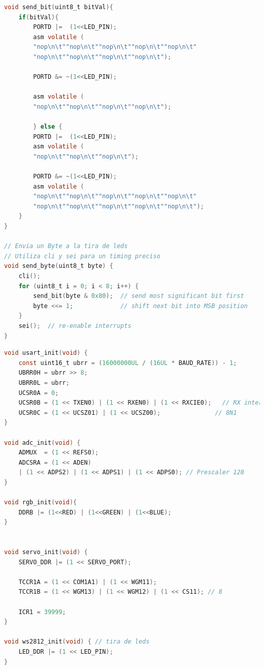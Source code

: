 \begin{lstlisting}[language=C, caption={Enviado de datos a tira LED`'}]
void send_bit(uint8_t bitVal){
	if(bitVal){
		PORTD |=  (1<<LED_PIN);
		asm volatile (
		"nop\n\t""nop\n\t""nop\n\t""nop\n\t""nop\n\t"
		"nop\n\t""nop\n\t""nop\n\t""nop\n\t");
		
		PORTD &= ~(1<<LED_PIN);
		
		asm volatile (
		"nop\n\t""nop\n\t""nop\n\t""nop\n\t");
		
		} else {
		PORTD |=  (1<<LED_PIN);
		asm volatile (
		"nop\n\t""nop\n\t""nop\n\t");
		
		PORTD &= ~(1<<LED_PIN);
		asm volatile (
		"nop\n\t""nop\n\t""nop\n\t""nop\n\t""nop\n\t"
		"nop\n\t""nop\n\t""nop\n\t""nop\n\t""nop\n\t");
	}
}

// Envia un Byte a la tira de leds
// Utiliza cli y sei para un timing preciso
void send_byte(uint8_t byte) {
	cli();  
	for (uint8_t i = 0; i < 8; i++) {
		send_bit(byte & 0x80);  // send most significant bit first
		byte <<= 1;             // shift next bit into MSB position
	}
	sei();  // re-enable interrupts
}
\end{lstlisting}

\begin{lstlisting}[language=C, caption={Inicializadores}]
void usart_init(void) {
	const uint16_t ubrr = (16000000UL / (16UL * BAUD_RATE)) - 1;
	UBRR0H = ubrr >> 8;
	UBRR0L = ubrr;
	UCSR0A = 0;
	UCSR0B = (1 << TXEN0) | (1 << RXEN0) | (1 << RXCIE0);   // RX interrupt
	UCSR0C = (1 << UCSZ01) | (1 << UCSZ00);               // 8N1
}

void adc_init(void) {
	ADMUX  = (1 << REFS0);                        
	ADCSRA = (1 << ADEN)                          
	| (1 << ADPS2) | (1 << ADPS1) | (1 << ADPS0); // Prescaler 128
}

void rgb_init(void){
	DDRB |= (1<<RED) | (1<<GREEN) | (1<<BLUE);
}


void servo_init(void) {
	SERVO_DDR |= (1 << SERVO_PORT); 

	TCCR1A = (1 << COM1A1) | (1 << WGM11);
	TCCR1B = (1 << WGM13) | (1 << WGM12) | (1 << CS11); // 8

	ICR1 = 39999;   
}
 
void ws2812_init(void) { // tira de leds
	LED_DDR |= (1 << LED_PIN);
}
\end{lstlisting}


